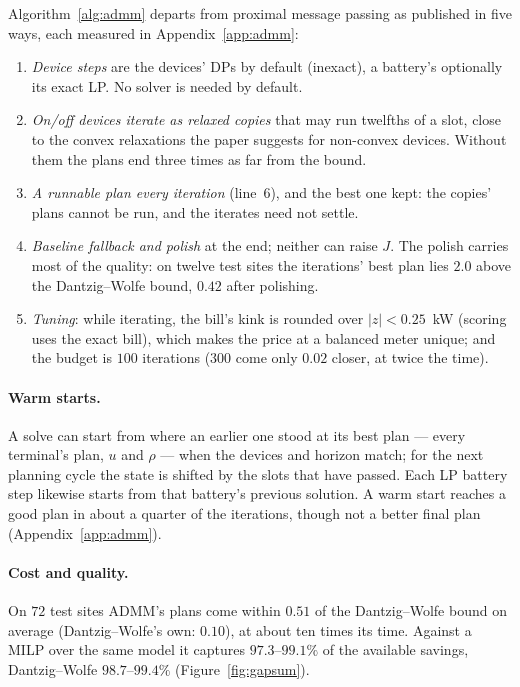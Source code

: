 \documentclass[11pt,a4paper]{article}
\begin{document}
Algorithm~\ref{alg:admm} departs from proximal message passing as published
\cite{kraning2014} in five ways, each measured in Appendix~\ref{app:admm}:
\begin{enumerate}[leftmargin=*,itemsep=2pt]
\item \emph{Device steps} are the devices' DPs by default (inexact), a battery's
  optionally its exact LP. No solver is needed by default.
\item \emph{On/off devices iterate as relaxed copies} that may run twelfths of
  a slot, close to the convex relaxations the paper suggests for non-convex
  devices. Without them the plans end three times as far from the bound.
\item \emph{A runnable plan every iteration} (line~6), and the best one kept:
  the copies' plans cannot be run, and the iterates need not settle.
\item \emph{Baseline fallback and polish} at the end; neither can raise $J$. The
  polish carries most of the quality: on twelve test sites the iterations' best
  plan lies $2.0$ above the Dantzig--Wolfe bound, $0.42$ after polishing.
\item \emph{Tuning}: while iterating, the bill's kink is rounded over
  $|z| < 0.25$~kW (scoring uses the exact bill), which makes the price at a
  balanced meter unique; and the budget is $100$ iterations ($300$ come only
  $0.02$ closer, at twice the time).
\end{enumerate}

\paragraph{Warm starts.} A solve can start from where an earlier one stood at its
best plan --- every terminal's plan, $u$ and $\rho$ --- when the devices and
horizon match; for the next planning cycle the state is shifted by the slots that
have passed. Each LP battery step likewise starts from that battery's previous
solution. A warm start reaches a good plan in about a quarter of the iterations,
though not a better final plan (Appendix~\ref{app:admm}).

\paragraph{Cost and quality.} On $72$ test sites ADMM's plans come within $0.51$
of the Dantzig--Wolfe bound on average (Dantzig--Wolfe's own: $0.10$), at about
ten times its time. Against a MILP over the same model it captures
$97.3$--$99.1\%$ of the available savings, Dantzig--Wolfe $98.7$--$99.4\%$
(Figure~\ref{fig:gapsum}).
\end{document}
